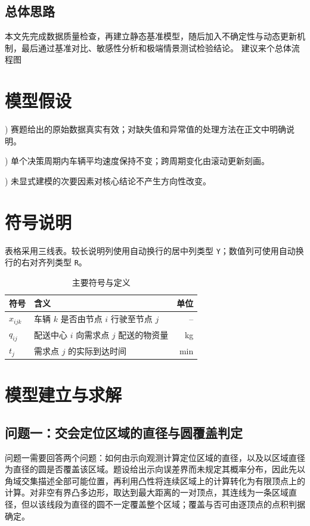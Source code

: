 \documentclass[zihao=-4,a4paper,UTF8,fontset=none]{ctexart}
\begin{document}
\subsection{总体思路}
本文先完成数据质量检查，再建立静态基准模型，随后加入不确定性与动态更新机制，最后通过基准对比、敏感性分析和极端情景测试检验结论。
建议来个总体流程图

\section{模型假设}
) 赛题给出的原始数据真实有效；对缺失值和异常值的处理方法在正文中明确说明。

) 单个决策周期内车辆平均速度保持不变；跨周期变化由滚动更新刻画。

) 未显式建模的次要因素对核心结论不产生方向性改变。

\section{符号说明}
表格采用三线表。较长说明列使用自动换行的居中列类型 \texttt{Y}；数值列可使用自动换行的右对齐列类型 \texttt{R}。

\begin{table}[H]
  \centering
  \caption{主要符号与定义}
  \label{tab:symbols}
  \begin{tabularx}{0.86\textwidth}{C{0.18\textwidth}Y R}
    \toprule
    符号 & 含义 & 单位 \\
    \midrule
    $x_{ijk}$ & 车辆 $k$ 是否由节点 $i$ 行驶至节点 $j$ & -- \\
    $q_{ij}$  & 配送中心 $i$ 向需求点 $j$ 配送的物资量 & \si{\kilogram} \\
    $t_j$     & 需求点 $j$ 的实际到达时间 & \si{\minute} \\
    \bottomrule
  \end{tabularx}
\end{table}

\section{模型建立与求解}


\subsection{问题一：交会定位区域的直径与圆覆盖判定}

问题一需要回答两个问题：如何由示向观测计算定位区域的直径，以及以区域直径为直径的圆是否覆盖该区域。题设给出示向误差界而未规定其概率分布，因此先以角域交集描述全部可能位置，再利用凸性将连续区域上的计算转化为有限顶点上的计算。对非空有界凸多边形，取达到最大距离的一对顶点，其连线为一条区域直径，但以该线段为直径的圆不一定覆盖整个区域；覆盖与否可由逐顶点的点积判据确定。
\end{document}
